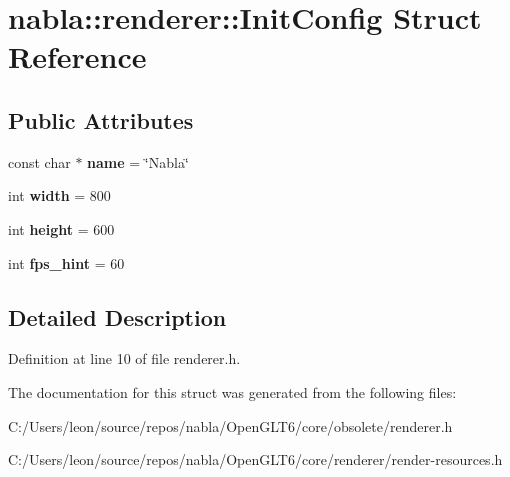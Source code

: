 \hypertarget{structnabla_1_1renderer_1_1_init_config}{}\section{nabla\+::renderer\+::Init\+Config Struct Reference}
\label{structnabla_1_1renderer_1_1_init_config}
\subsection*{Public Attributes}
\begin{DoxyCompactItemize}
\item 
\mbox{\label{structnabla_1_1renderer_1_1_init_config_a468d22abfe42dfa26afbd62b9bb61d65}} 
const char $\ast$ {\bfseries name} = \char`\"{}Nabla\char`\"{}
\item 
\mbox{\label{structnabla_1_1renderer_1_1_init_config_ac9ec130f38b0baec8c4df6dcaaf40265}} 
int {\bfseries width} = 800
\item 
\mbox{\label{structnabla_1_1renderer_1_1_init_config_a334c731062f3de409f333b9115d5f125}} 
int {\bfseries height} = 600
\item 
\mbox{\label{structnabla_1_1renderer_1_1_init_config_af54576ed84d4ff3e6d32260f0fb7ddd5}} 
int {\bfseries fps\+\_\+hint} = 60
\end{DoxyCompactItemize}


\subsection{Detailed Description}


Definition at line 10 of file renderer.\+h.



The documentation for this struct was generated from the following files\+:\begin{DoxyCompactItemize}
\item 
C\+:/\+Users/leon/source/repos/nabla/\+Open\+G\+L\+T6/core/obsolete/renderer.\+h\item 
C\+:/\+Users/leon/source/repos/nabla/\+Open\+G\+L\+T6/core/renderer/render-\/resources.\+h\end{DoxyCompactItemize}
